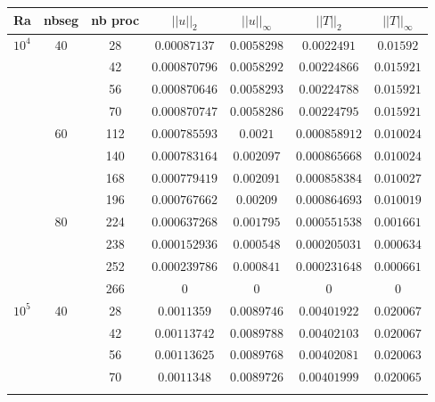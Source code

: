 \begin{table}[!h]
	\begin{center}
		\begin{tabular}{|*{7}{c|}}
			\hline
			 Ra & nbseg & nb proc                     & $||u||_{2}$                        & $||u||_{\infty}$                & $||T||_{2}$              & $||T||_{\infty}$\\ \hline \hline
			\multirow{12}{*}{$10^4$} & \multirow{4}{*}{40} & 28 & $0.00087137$ & $0.0058298$ & $ 0.0022491 $ & $0.01592$ \\
			\cline{3-7}
			& & 42 & $0.000870796$ & $0.0058292$ & $ 0.00224866 $ & $0.015921$ \\ \cline{3-7} %
			& & 56 & $0.000870646$ & $0.0058293$ & $ 0.00224788 $ & $0.015921$  \\ \cline{3-7} %
			& & 70 & $0.000870747$ & $0.0058286$ & $ 0.00224795 $ & $0.015921$ \\ \cline{2-7}
			 & \multirow{4}{*}{60} & 112 & $0.000785593$ & $0.0021$ & $ 0.000858912 $ & $0.010024$ \\%
			\cline{3-7}
			& & 140 & $0.000783164$ & $0.002097$ & $ 0.000865668 $ & $0.010024$ \\ \cline{3-7} %
			& & 168 & $0.000779419$ & $0.002091$ & $ 0.000858384 $ & $0.010027$  \\ \cline{3-7} %
			& & 196 & $0.000767662$ & $0.00209$ & $ 0.000864693 $ & $0.010019$ \\ \cline{2-7}
			 & \multirow{4}{*}{80} & 224 & $0.000637268$ & $0.001795$ & $ 0.000551538 $ & $0.001661$ \\%
			\cline{3-7}
			& & 238 & $0.000152936$ & $0.000548$ & $ 0.000205031 $ & $0.000634$ \\ \cline{3-7} %
			& & 252 & $0.000239786$ & $0.000841$ & $ 0.000231648 $ & $0.000661$  \\ \cline{3-7} %
			& & 266 & $0$ & $0$ & $ 0 $ & $0$ \\ \hline 
			\multirow{12}{*}{$10^5$}& \multirow{4}{*}{40} & 28 & $0.0011359$ & $0.0089746$ & $ 0.00401922 $ & $0.020067$ \\%
			\cline{3-7}
			& & 42 & $0.00113742$ & $0.0089788$ & $ 0.00402103 $ & $0.020067$  \\ \cline{3-7} %
			& & 56 & $0.00113625$ & $0.0089768$ & $ 0.00402081 $ & $0.020063$   \\ \cline{3-7}%
			& & 70 & $0.0011348$ & $0.0089726$ & $ 0.00401999 $ & $0.020065$  \\ \cline{2-7} %

\end{tabular}
\end{center}
\end{table}
